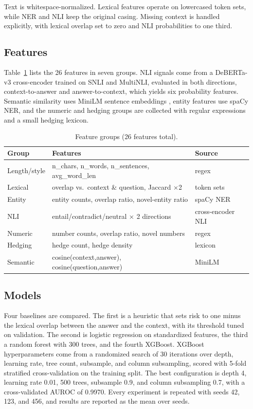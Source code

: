 Text is whitespace-normalized. Lexical features operate on lowercased token sets, while NER and NLI keep the original casing. Missing context is handled explicitly, with lexical overlap set to zero and NLI probabilities to one third.

\subsection{Features}

Table~\ref{tab:features} lists the 26 features in seven groups. NLI signals come from a DeBERTa-v3 cross-encoder trained on SNLI and MultiNLI, evaluated in both directions, context-to-answer and answer-to-context, which yields six probability features. Semantic similarity uses MiniLM sentence embeddings \cite{sbert}, entity features use spaCy NER, and the numeric and hedging groups are collected with regular expressions and a small hedging lexicon.

\begin{table}[t]
\centering
\small
\caption{Feature groups (26 features total).}
\label{tab:features}
\begin{tabular}{@{}lll@{}}
\toprule
\textbf{Group} & \textbf{Features} & \textbf{Source} \\
\midrule
Length/style  & n\_chars, n\_words, n\_sentences, avg\_word\_len & regex \\
Lexical       & overlap vs.\ context \& question, Jaccard $\times$2 & token sets \\
Entity        & entity counts, overlap ratio, novel-entity ratio & spaCy NER \\
NLI           & entail/contradict/neutral $\times$ 2 directions & cross-encoder NLI \\
Numeric       & number counts, overlap ratio, novel numbers & regex \\
Hedging       & hedge count, hedge density & lexicon \\
Semantic      & cosine(context,answer), cosine(question,answer) & MiniLM \\
\bottomrule
\end{tabular}
\end{table}

\subsection{Models}

Four baselines are compared. The first is a heuristic that sets risk to one minus the lexical overlap between the answer and the context, with its threshold tuned on validation. The second is logistic regression on standardized features, the third a random forest with 300 trees, and the fourth XGBoost. XGBoost hyperparameters come from a randomized search of 30 iterations over depth, learning rate, tree count, subsample, and column subsampling, scored with 5-fold stratified cross-validation on the training split. The best configuration is depth 4, learning rate 0.01, 500 trees, subsample 0.9, and column subsampling 0.7, with a cross-validated AUROC of 0.9970. Every experiment is repeated with seeds 42, 123, and 456, and results are reported as the mean over seeds.

